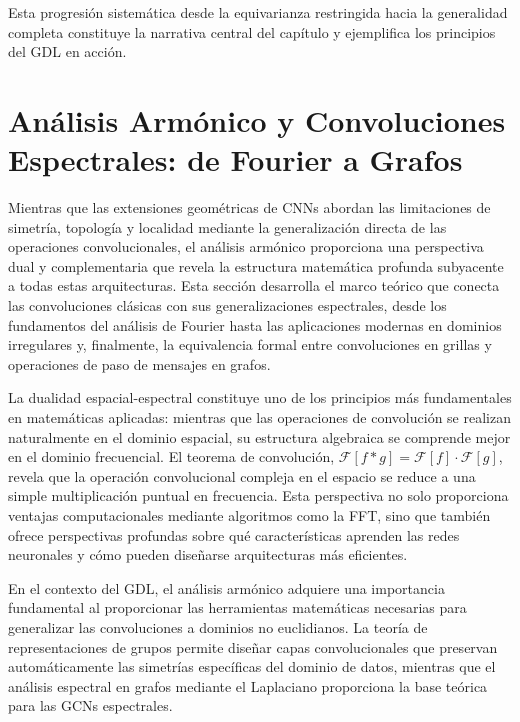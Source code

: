 Esta progresión sistemática desde la equivarianza restringida hacia la generalidad completa constituye la narrativa central del capítulo y ejemplifica los principios del \gls{GDL} en acción.

\section[Análisis Armónico y Convoluciones Espectrales]{Análisis Armónico y Convoluciones Espectrales: de Fourier a Grafos}\label{sec:analisis_armonico}

Mientras que las extensiones geométricas de \glspl{CNN} abordan las limitaciones de simetría, topología y localidad mediante la generalización directa de las operaciones convolucionales, el análisis armónico proporciona una perspectiva dual y complementaria que revela la estructura matemática profunda subyacente a todas estas arquitecturas. Esta sección desarrolla el marco teórico que conecta las convoluciones clásicas con sus generalizaciones espectrales, desde los fundamentos del análisis de Fourier hasta las aplicaciones modernas en dominios irregulares y, finalmente, la equivalencia formal entre convoluciones en grillas y operaciones de paso de mensajes en grafos.

La dualidad espacial-espectral constituye uno de los principios más fundamentales en matemáticas aplicadas: mientras que las operaciones de convolución se realizan naturalmente en el dominio espacial, su estructura algebraica se comprende mejor en el dominio frecuencial. El teorema de convolución, $\mathcal{F}[f * g] = \mathcal{F}[f] \cdot \mathcal{F}[g]$, revela que la operación convolucional compleja en el espacio se reduce a una simple multiplicación puntual en frecuencia. Esta perspectiva no solo proporciona ventajas computacionales mediante algoritmos como la \gls{FFT}, sino que también ofrece perspectivas profundas sobre qué características aprenden las redes neuronales y cómo pueden diseñarse arquitecturas más eficientes.

En el contexto del \gls{GDL}, el análisis armónico adquiere una importancia fundamental al proporcionar las herramientas matemáticas necesarias para generalizar las convoluciones a dominios no euclidianos. La teoría de representaciones de grupos permite diseñar capas convolucionales que preservan automáticamente las simetrías específicas del dominio de datos, mientras que el análisis espectral en grafos mediante el Laplaciano proporciona la base teórica para las \glspl{GCN} espectrales.

